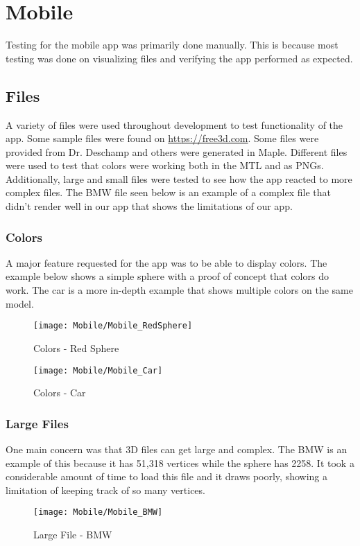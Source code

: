 
\section{Mobile}
    Testing for the mobile app was primarily done manually. This is because most testing was done on visualizing files and verifying the app performed as expected.
    \subsection{Files}
        A variety of files were used throughout development to test functionality of the app. Some sample files were found on \url{https://free3d.com}. Some files were provided from Dr. Deschamp and others were generated in Maple. Different files were used to test that colors were working both in the MTL and as PNGs. Additionally, large and small files were tested to see how the app reacted to more complex files. The BMW file seen below is an example of a complex file that didn't render well in our app that shows the limitations of our app.
        \subsubsection{Colors}
        A major feature requested for the app was to be able to display colors. The example below shows a simple sphere with a proof of concept that colors do work. The car is a more in-depth example that shows multiple colors on the same model.
        \begin{figure}[H]
            \texttt{[image: Mobile/Mobile\_RedSphere]}
            \centering
            \caption{Colors - Red Sphere}
            \label{fig:mobileRedSphere}
        \end{figure}

        \begin{figure}[H]
            \texttt{[image: Mobile/Mobile\_Car]}
            \centering
            \caption{Colors - Car}
            \label{fig:mobileCar}
        \end{figure}
        
        \subsubsection{Large Files}
        One main concern was that 3D files can get large and complex. The BMW is an example of this because it has 51,318 vertices while the sphere has 2258. It took a considerable amount of time to load this file and it draws poorly, showing a limitation of keeping track of so many vertices.
            \begin{figure}[H]
                \texttt{[image: Mobile/Mobile\_BMW]}
                \centering
                \caption{Large File - BMW}
                \label{fig:mobileBMW}
            \end{figure}
    
